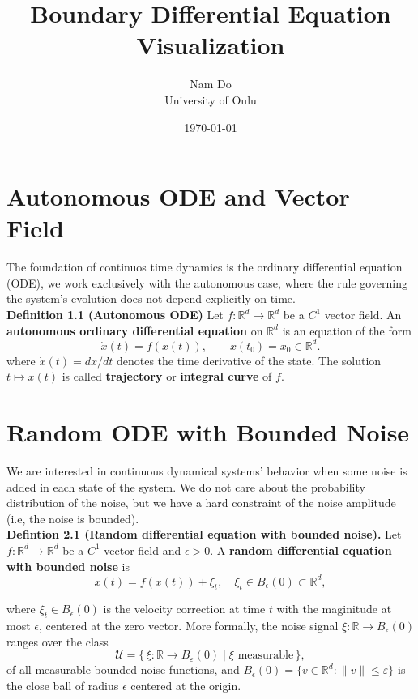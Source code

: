 \documentclass[11pt]{article}
\title{Boundary Differential Equation Visualization}
\author{Nam Do\\University of Oulu}
\date{\today}
\begin{document}
\maketitle
\section{Autonomous ODE and Vector Field}
The foundation of continuos time dynamics is the ordinary differential equation (ODE), we work exclusively with the autonomous case, where the rule governing the system's evolution does not depend explicitly on time.\\
\textbf{Definition 1.1 (Autonomous ODE)}
Let \(f: \mathbb{R}^d \to \mathbb{R}^d \) be a \(C^1\) vector field. An \textbf{autonomous ordinary differential equation} on \(\mathbb{R}^d\) is an equation of the form
\[
    \dot{x}(t) = f(x(t)), \qquad x(t_0) = x_0 \in \mathbb{R}^d. \tag{1}
\]
where \(\dot{x}(t) = dx/dt\) denotes the time derivative of the state. The solution \(t \mapsto x(t)\) is called \textbf{trajectory} or \textbf{integral curve} of $f$.
\section{Random ODE with Bounded Noise}
We are interested in continuous dynamical systems' behavior when some noise is added in each state of the system. We do not care about the probability distribution of the noise, but we have a hard constraint of the noise amplitude (i.e, the noise is bounded). \\
\textbf{Defintion 2.1 (Random differential equation with bounded noise).} 
Let \( f : \mathbb{R}^d \to \mathbb{R}^d \) be a \( C^1 \) vector field and \(\epsilon > 0\). A \textbf{random differential equation with bounded noise} is
\[
    \dot{x}(t) = f(x(t)) + \xi_t, \quad \xi_t \in B_\epsilon(0) \subset \mathbb{R}^d, \tag{2}\label{eq:rde}
\]

where \(\xi_t \in B_\epsilon(0)\) is the velocity correction at time $t$ with the maginitude at most $\epsilon$, centered at the zero vector. More formally, the noise signal $\xi: \mathbb{R} \to B_\epsilon(0)$ ranges over the class
\[
\mathcal{U} = \bigl\{\, \xi : \mathbb{R} \to B_\varepsilon(0) \;\big|\; \xi \text{ measurable} \,\bigr\}, \tag{3}
\]
of all measurable bounded-noise functions, and \(B_\epsilon(0) = \{v \in \mathbb{R}^d : \|v\| \leq \varepsilon \}\) is the close ball of radius $\epsilon$ centered at the origin.
\end{document}
